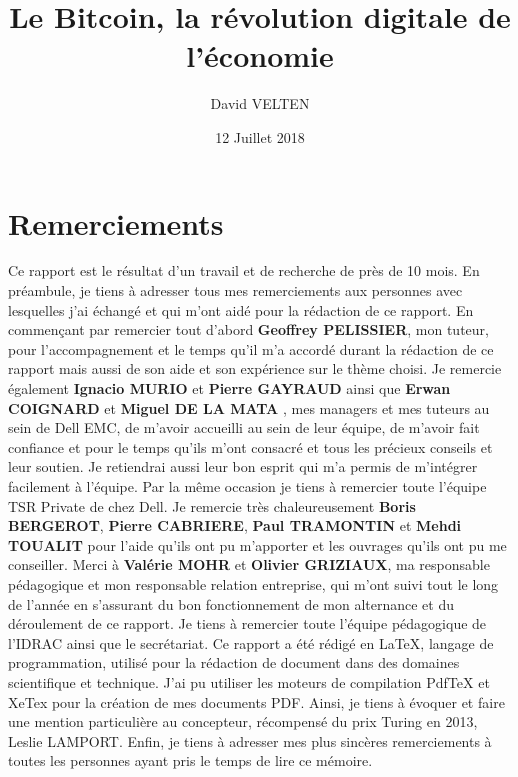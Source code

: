 \documentclass{bredele} %
\title{Le Bitcoin, la révolution digitale de l'économie}
\author{David VELTEN}
\date{12 Juillet 2018}
\begin{document}
    \let\cleardoublepage\clearpage
    \maketitle
    
    \chapter*{Remerciements}
    Ce rapport est le résultat d’un travail et de recherche de près de 10 mois. En préambule, je tiens à adresser tous mes remerciements aux personnes avec lesquelles j’ai échangé et qui m’ont aidé pour la rédaction de ce rapport.
    \newline
    \newline
    En commençant par remercier tout d’abord \textbf{Geoffrey PELISSIER}, mon tuteur, pour l’accompagnement et le temps qu’il m’a accordé durant la rédaction de ce rapport mais aussi de son aide et son expérience sur le thème choisi.
    \newline
    \newline
    Je remercie également \textbf{Ignacio MURIO} et \textbf{Pierre GAYRAUD} ainsi que \textbf{Erwan COIGNARD} et \textbf{Miguel DE LA MATA}	, mes managers et mes tuteurs au sein de Dell EMC, de m’avoir accueilli au sein de leur équipe, de m’avoir fait confiance et pour le temps qu’ils m’ont consacré et tous les précieux conseils et leur soutien.
    \newline
    \newline
    Je retiendrai aussi leur bon esprit qui m’a permis de m’intégrer facilement à l’équipe. Par la même occasion je tiens à remercier toute l’équipe TSR Private de chez Dell.
    \newline
    \newline
    Je remercie très chaleureusement \textbf{Boris BERGEROT}, \textbf{Pierre CABRIERE}, \textbf{Paul TRAMONTIN} et \textbf{Mehdi TOUALIT} pour l’aide qu’ils ont pu m’apporter et les ouvrages qu’ils ont pu me conseiller.
    \newline
    \newline
    Merci à \textbf{Valérie MOHR} et \textbf{Olivier GRIZIAUX}, ma responsable pédagogique et mon responsable relation entreprise, qui m’ont suivi tout le long de l’année en s’assurant du bon fonctionnement de mon alternance et du déroulement de ce rapport.
    \newline
    \newline
    Je tiens à remercier toute l’équipe pédagogique de l’IDRAC ainsi que le secrétariat.
    \newline
    \newline
    Ce rapport a été rédigé en LaTeX, langage de programmation, utilisé pour la rédaction de document dans des domaines scientifique et technique. J’ai pu utiliser les moteurs de compilation PdfTeX et XeTex pour la création de mes documents PDF. Ainsi, je tiens à évoquer et faire une mention particulière au concepteur, récompensé du prix Turing en 2013, Leslie LAMPORT.
    \newline
    \newline
    Enfin, je tiens à adresser mes plus sincères remerciements à toutes les personnes ayant pris le temps de lire ce mémoire.
\end{document}
